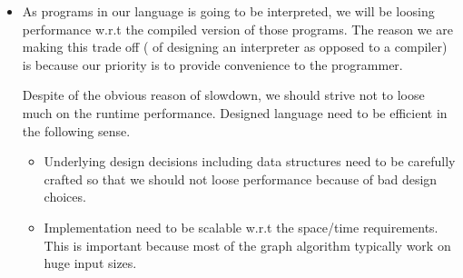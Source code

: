 \begin{itemize}
    \item
        As programs in our language is going to be interpreted, we will be loosing 
        performance w.r.t the compiled version of those programs.
        The reason we are making this trade off ( of designing an interpreter as 
            opposed to a compiler) is 
        because our priority is to provide convenience to the programmer.

        Despite of the obvious reason of slowdown, we should strive not to loose 
        much on the runtime performance.
    Designed language need to be efficient in the following sense.
      \begin{itemize} 
        \item 
        Underlying design decisions including data structures
    need to be carefully crafted so that we should not loose performance because 
    of bad design choices.
        \item Implementation need to be scalable w.r.t the space/time
    requirements. This is important because most of the graph algorithm
    typically work on huge input sizes.  
      \end{itemize} 
    \end{itemize}       


